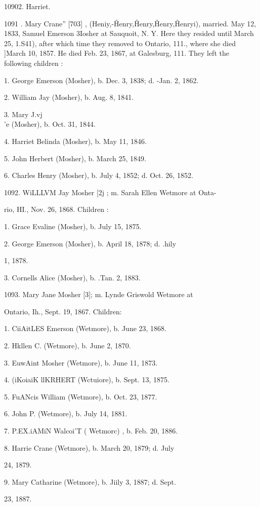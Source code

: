 10902. Harriet. 

1091 . Mary Crane'' [703] , (Heniy,-\^ Henry,\^ Henry,\^ Henry,\^ 
Henryi), married. May 12, 1833, Samuel Emerson 3Iosher at 
Sauquoit, N. Y. Here they resided until March 25, 1.S41), after 
which time they removed to Ontario, 111., where she died ]March 
10, 1857. He died Feb. 23, 1867, at Galesburg, 111. They left 
the following children : 

1. George Emerson (Mosher), b. Dec. 3, 1838; d. -Jan. 2, 1862. 

2. William Jay (Mosher), b. Aug. 8, 1841. 

3. Mary J.vj\\'e (Mosher), b. Oct. 31, 1844. 

4. Harriet Belinda (Mosher), b. May 11, 1846. 

5. John Herbert (Mosher), b. March 25, 1849. 

6. Charles Henry (Mosher), b. July 4, 1852; d. Oct. 26, 1852. 

1092. WiLLLVM Jay Mosher [2j ; m. Sarah Ellen Wetmore at Onta- 

rio, HI., Nov. 26, 1868. Children : 

1. Grace Evaline (Mosher), b. July 15, 1875. 

2. George Emerson (Mosher), b. April 18, 1878; d. .hily 

1, 1878. 

3. Cornells Alice (Mosher), b. .Tan. 2, 1883. 

1093. Mary Jane Mosher [3]; m. Lynde Griswold Wetmore at 

Ontario, Ih., Sept. 19, 1867. Children: 

1. CiiAitLES Emerson (Wetmore), b. June 23, 1868. 

2. Hkllen C. (Wetmore), b. June 2, 1870. 

3. EuwAint Mosher (Wetmore), b. June 11, 1873. 

4. (iKoiaiK llKRHERT (Wctuiore), b. Sept. 13, 1875. 

5. FuANcis William (Wetmore), b. Oct. 23, 1877. 

6. John P. (Wetmore), b. July 14, 1881. 

7. P.EX.iAMiN Walcoi'T ( Wetmorc) , b. Feb. 20, 1886. 

8. Harrie Crane (Wetmore), b. March 20, 1879; d. July 

24, 1879. 

9. Mary Catharine (Wetmore), b. Jiily 3, 1887; d. Sept. 

23, 1887. 

